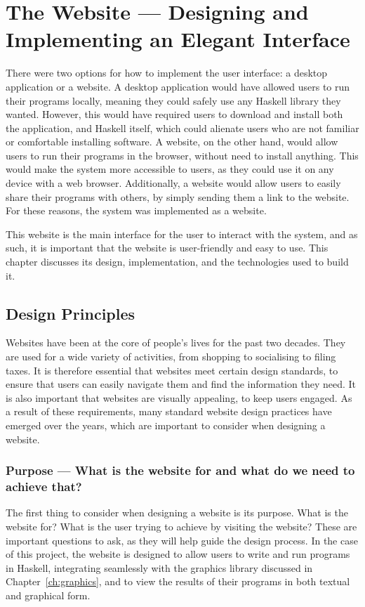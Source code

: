 \documentclass[../main.tex]{subfiles}
\begin{document}
\chapter{The Website — Designing and Implementing an Elegant Interface} \label{ch:website}
    There were two options for how to implement the user interface: a desktop
        application or a website.
    A desktop application would have allowed users to run their programs locally,
        meaning they could safely use any Haskell library they wanted.
    However, this would have required users to download and install both the
        application, and Haskell itself, which could alienate users who are not
        familiar or comfortable installing software.
    A website, on the other hand, would allow users to run their programs in the
        browser, without need to install anything.
    This would make the system more accessible to users, as they could use it on
        any device with a web browser.
    Additionally, a website would allow users to easily share their programs with
        others, by simply sending them a link to the website.
    For these reasons, the system was implemented as a website.

    This website is the main interface for the user to interact with the system,
        and as such, it is important that the website is user-friendly and easy to use.
    This chapter discusses its design, implementation, and the technologies used to
        build it.

    \section{Design Principles}
        Websites have been at the core of people's lives for the past two decades.
        They are used for a wide variety of activities, from shopping to socialising to
            filing taxes.
        It is therefore essential that websites meet certain design standards, to
            ensure that users can easily navigate them and find the information they need.
        It is also important that websites are visually appealing, to keep users
            engaged.
        As a result of these requirements, many standard website design practices have
            emerged over the years, which are important to consider when designing a
            website.

        \subsection{Purpose — What is the website for and what do we need to achieve that?}
            The first thing to consider when designing a website is its purpose.
            What is the website for?
            What is the user trying to achieve by visiting the website?
            These are important questions to ask, as they will help guide the design
                process.
            In the case of this project, the website is designed to allow users to write
                and run programs in Haskell, integrating seamlessly with the graphics library
                discussed in Chapter~\ref{ch:graphics}, and to view the results of their
                programs in both textual and graphical form.
\end{document}
